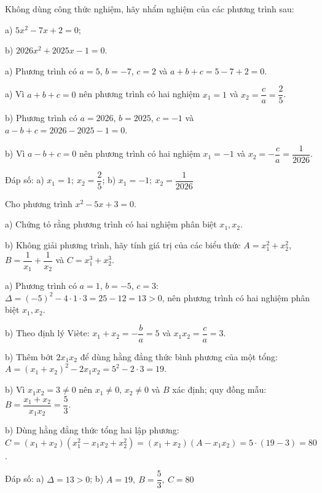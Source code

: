 \begin{problem}[9DS-PT2-004]
Không dùng công thức nghiệm, hãy nhẩm nghiệm của các phương trình sau:

a) $5x^2 - 7x + 2 = 0$;

b) $2026x^2 + 2025x - 1 = 0$.

\begin{solution}
a) Phương trình có $a = 5$, $b = -7$, $c = 2$ và $a + b + c = 5 - 7 + 2 = 0$.

a) Vì $a + b + c = 0$ nên phương trình có hai nghiệm $x_1 = 1$ và $x_2 = \dfrac{c}{a} = \dfrac{2}{5}$.

b) Phương trình có $a = 2026$, $b = 2025$, $c = -1$ và $a - b + c = 2026 - 2025 - 1 = 0$.

b) Vì $a - b + c = 0$ nên phương trình có hai nghiệm $x_1 = -1$ và $x_2 = -\dfrac{c}{a} = \dfrac{1}{2026}$.

Đáp số: a) $\boxed{x_1 = 1;\ x_2 = \dfrac{2}{5}}$; b) $\boxed{x_1 = -1;\ x_2 = \dfrac{1}{2026}}$
\end{solution}
\end{problem}

\begin{problem}[9DS-PT2-005]
Cho phương trình $x^2 - 5x + 3 = 0$.

a) Chứng tỏ rằng phương trình có hai nghiệm phân biệt $x_1, x_2$.

b) Không giải phương trình, hãy tính giá trị của các biểu thức $A = x_1^2 + x_2^2$, $B = \dfrac{1}{x_1} + \dfrac{1}{x_2}$ và $C = x_1^3 + x_2^3$.

\begin{solution}
a) Phương trình có $a = 1$, $b = -5$, $c = 3$: $\Delta = (-5)^2 - 4 \cdot 1 \cdot 3 = 25 - 12 = 13 > 0$, nên phương trình có hai nghiệm phân biệt $x_1, x_2$.

b) Theo định lý Viète: $x_1 + x_2 = -\dfrac{b}{a} = 5$ và $x_1 x_2 = \dfrac{c}{a} = 3$.

b) Thêm bớt $2x_1x_2$ để dùng hằng đẳng thức bình phương của một tổng: $A = (x_1 + x_2)^2 - 2x_1x_2 = 5^2 - 2 \cdot 3 = 19$.

b) Vì $x_1 x_2 = 3 \neq 0$ nên $x_1 \neq 0$, $x_2 \neq 0$ và $B$ xác định; quy đồng mẫu: $B = \dfrac{x_1 + x_2}{x_1 x_2} = \dfrac{5}{3}$.

b) Dùng hằng đẳng thức tổng hai lập phương: $C = (x_1 + x_2)(x_1^2 - x_1x_2 + x_2^2) = (x_1 + x_2)(A - x_1x_2) = 5 \cdot (19 - 3) = 80$.

Đáp số: a) $\boxed{\Delta = 13 > 0}$; b) $\boxed{A = 19,\ B = \dfrac{5}{3},\ C = 80}$
\end{solution}
\end{problem}

